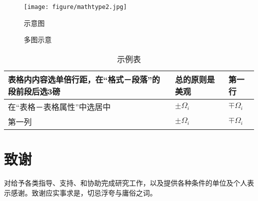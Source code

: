 \documentclass{ZUST_Thesis}
\begin{document}
\begin{figure}[h]
	\centering
	\texttt{[image: figure/mathtype2.jpg]}   
	\caption{示意图}
	\label{fig_example}
\end{figure}


\begin{figure}[h]
	\centering
	\caption{多图示意}
	\label{fig_subexample}
\end{figure}

\begin{table}[h]
	\small
	\setlength{\abovecaptionskip}{0em}
	\setlength{\belowcaptionskip}{0.5em}
	\renewcommand\arraystretch{1.5}
	\setlength\tabcolsep{3pt}
	\centering
	\caption{示例表}
	\label{tab_example}
	\begin{tabular}{m{4cm}<{\centering}m{3cm}<{\centering}m{2cm}<{\centering}}
		\toprule
		表格内内容选单倍行距，在“格式－段落”的段前段后选3磅&总的原则是美观&第一行\\
		\midrule
		在“表格－表格属性”中选居中&$\pm\Omega_i$&$\mp\Omega_i$\\
		第一列&$\pm\Omega_i$&$\mp\Omega_i$\\
		\bottomrule
	\end{tabular}
\end{table}





\newpage
\pagestyle{appendix}
\renewcommand{\refname}{参\quad 考\quad 文\quad 献}
\setlength{\bibsep}{0em}

\begin{spacing}{1.25} 
	
\end{spacing}



\newpage
\pagestyle{acknowledgement}
\section*{致\qquad 谢}
对给予各类指导、支持、和协助完成研究工作，以及提供各种条件的单位及个人表示感谢。致谢应实事求是，切忌浮夸与庸俗之词。 
\end{document}
